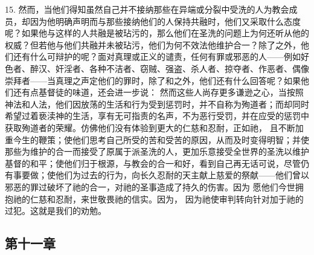 15. 然而，当他们得知虽然自己并不接纳那些在异端或分裂中受洗的人为教会成员，却因为他明确声明而与那些接纳他们的人保持共融时，他们又采取什么态度呢？如果他与这样的人共融是被玷污的，那么他们在圣洗的问题上为何还听从他的权威？但若他与他们共融并未被玷污，他们为何不效法他维护合一？除了之外，他们还有什么可辩护的呢？面对真理或正义的谴责，任何有罪或邪恶的人——例如好色者、醉汉、奸淫者、各种不洁者、窃贼、强盗、杀人者、掠夺者、作恶者、偶像崇拜者——当真理之声定他们的罪时，除了和之外，他们还有什么回答呢？如果他们还有点基督徒的味道，还会进一步说： 然而这些人尚存更多谦逊之心，当按照神法和人法，他们因放荡的生活和行为受到惩罚时，并不自称为殉道者；而却同时希望过着亵渎神的生活，享有无可指责的名声，不为恶行受罚，并在应受的惩罚中获取殉道者的荣耀。仿佛他们没有体验到更大的仁慈和忍耐，正如祂， 且不断加重今生的鞭策；使他们思考自己所受的苦和受苦的原因，从而及时变得明智；并使那些为维护的合一而接受了原属于派圣洗的人，更加乐意接受全世界的圣洗以维护基督的和平；使他们归于根源，与教会的合一和好，看到自己再无话可说，尽管仍有事要做；使他们为过去的行为，向长久忍耐的天主献上慈爱的祭献——他们曾以邪恶的罪过破坏了祂的合一，对祂的圣事造成了持久的伤害。因为 愿他们今世拥抱祂的仁慈和忍耐，来世敬畏祂的信实。因为， 因为祂使审判转向针对加于祂的过犯。这就是我们的劝勉。\par


\subsection{第十一章}

